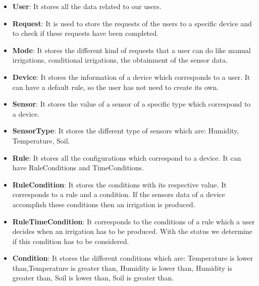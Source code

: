 \documentclass[11pt,a4paper]{article}
\begin{document}
\begin{itemize}
\item \textbf{User}: It stores all the data related to our users.

\item \textbf{Request}: It is used to store the requests of the users  to a specific device and to check if these requests have been completed. 

\item \textbf{Mode}: It stores the different kind of requests that a user can do  like manual irrigations, conditional irrigations, the obtainment of the sensor data.

\item \textbf{Device}: It stores the information of a device which corresponds to a user. It can have a default rule, so the user has not need to create its own. 

\item \textbf{Sensor}: It stores the value of a sensor of a specific type which correspond to a device.

\item \textbf{SensorType}: It stores the different type of sensors which are: Humidity, Temperature, Soil.

\item \textbf{Rule}: It stores all the configurations which correspond to a device. It can have RuleConditions and TimeConditions.

\item \textbf{RuleCondition}: It stores the conditions  with its respective value. It corresponds to a rule and a condition. If the sensors data of a device accomplish these conditions then an irrigation is produced.  

\item \textbf{RuleTimeCondition}: It corresponds to the conditions of a rule which a user decides when an irrigation has to be produced.  With the status we determine if this condition has to be considered.

\item \textbf{Condition}: It stores the different conditions which are: Temperature is lower than,Temperature is greater than, Humidity is lower than,  Humidity is greater than, Soil is lower than, Soil is greater than.
\end{itemize}
\end{document}
